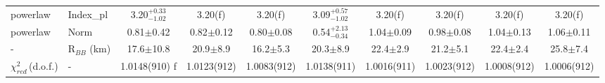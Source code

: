\documentclass{aa}
\begin{document}
\begin{appendix}
\begin{sidewaystable*}
\begin{tabular}{llcccccccc}
\hline
 

 
powerlaw  &  
Index\_pl &
3.20$^{+0.33}_{-1.02}$ &
3.20(f) &
3.20(f) &
3.09$^{+0.57}_{-1.02}$ & 
3.20(f)&
3.20(f)&
3.20(f) &
3.20(f) \\ 



powerlaw  &  
Norm &
0.81$\pm$0.42 &
0.82$\pm$0.12 &
0.80$\pm$0.08 &
0.54$^{+2.13}_{-0.34}$ &
1.04$\pm$0.09 & 
0.98$\pm$0.08 &
1.04$\pm$0.13 &
1.06$\pm$0.11 \\

\hline
 
 - &
R$_{BB}$ (km)  &  
17.6$\pm$10.8 &
20.9$\pm$8.9&
16.2$\pm$5.3&
20.3$\pm$8.9&
22.4$\pm$2.9&
21.2$\pm$5.1 &
22.4$\pm$2.4 &
25.8$\pm$7.4 \\

 

\hline
 

 $\chi^{2}_{red}\,$(d.o.f.)   &
 - &
1.0148(910) f&
1.0123(912) &
1.0083(912) & 
1.0138(911) & 
1.0016(911) &
1.0023(912) &
1.0008(912) &
1.0006(912) \\
 
\hline   
         
\end{tabular}


 \\

\end{sidewaystable*}



\end{appendix}

\normalsize
\end{document}
